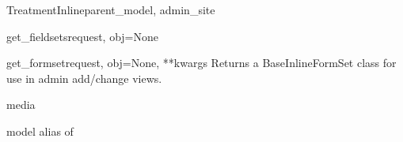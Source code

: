 \documentclass[letterpaper,10pt,english]{sphinxmanual}
\begin{document}
\begin{classdesc}{TreatmentInline}{parent\_model, admin\_site}
\hypertarget{data.admin.TreatmentInline.get_fieldsets}{}\begin{methoddesc}{get\_fieldsets}{request, obj=None}\end{methoddesc}

\hypertarget{data.admin.TreatmentInline.get_formset}{}\begin{methoddesc}{get\_formset}{request, obj=None, **kwargs}
Returns a BaseInlineFormSet class for use in admin add/change views.
\end{methoddesc}

\hypertarget{data.admin.TreatmentInline.media}{}\begin{memberdesc}{media}\end{memberdesc}

\hypertarget{data.admin.TreatmentInline.model}{}\begin{memberdesc}{model}
alias of 
\end{memberdesc}
\end{classdesc}
\end{document}

